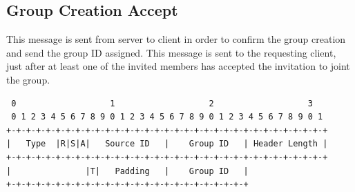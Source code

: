 \documentclass{article}
\begin{document}
\subsection{Group Creation Accept}
This message is sent from server to client in order to confirm the group creation and send the group ID assigned. This message is sent to the requesting client, just after at least one of the invited members has accepted the invitation to joint the group. 
\begin{verbatim}  
 0                   1                   2                   3  
 0 1 2 3 4 5 6 7 8 9 0 1 2 3 4 5 6 7 8 9 0 1 2 3 4 5 6 7 8 9 0 1
+-+-+-+-+-+-+-+-+-+-+-+-+-+-+-+-+-+-+-+-+-+-+-+-+-+-+-+-+-+-+-+-+
|   Type  |R|S|A|   Source ID   |    Group ID   | Header Length |
+-+-+-+-+-+-+-+-+-+-+-+-+-+-+-+-+-+-+-+-+-+-+-+-+-+-+-+-+-+-+-+-+
|               |T|   Padding   |    Group ID   |
+-+-+-+-+-+-+-+-+-+-+-+-+-+-+-+-+-+-+-+-+-+-+-+-+
\end{verbatim}
\end{document}
